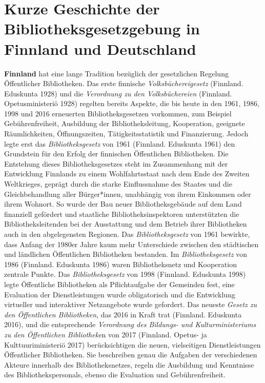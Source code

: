\documentclass[a4paper,
fontsize=11pt,
oneside,
numbers=noperiodatend,
parskip=half-,
bibliography=totoc,
final
]{scrartcl}
\begin{document}
\hypertarget{kurze-geschichte-der-bibliotheksgesetzgebung-in-finnland-und-deutschland}{%
\section{Kurze Geschichte der Bibliotheksgesetzgebung in Finnland
und
Deutschland}\label{kurze-geschichte-der-bibliotheksgesetzgebung-in-finnland-und-deutschland}}

\textbf{Finnland} hat eine lange Tradition bezüglich der gesetzlichen
Regelung Öffentlicher Bibliotheken. Das erste finnische
\emph{Volksbüchereigesetz} (Finnland. Eduskunta 1928) und die
\emph{Verordnung zu den Volksbüchereien} (Finnland. Opetusministeriö
1928) regelten bereits Aspekte, die bis heute in den 1961, 1986, 1998
und 2016 erneuerten Bibliotheksgesetzen vorkommen, zum Beispiel
Gebührenfreiheit, Ausbildung der Bibliotheksleitung, Kooperation,
geeignete Räumlichkeiten, Öffnungszeiten, Tätigkeitsstatistik und
Finanzierung. Jedoch legte erst das \emph{Bibliotheksgesetz} von 1961
(Finnland. Eduskunta 1961) den Grundstein für den Erfolg der finnischen
Öffentlichen Bibliotheken. Die Entstehung dieses Bibliotheksgesetzes
steht im Zusammenhang mit der Entwicklung Finnlands zu einem
Wohlfahrtsstaat nach dem Ende des Zweiten Weltkrieges, geprägt durch die
starke Einflussnahme des Staates und die Gleichbehandlung aller
Bürger*innen, unabhängig von ihrem Einkommen oder ihrem Wohnort. So
wurde der Bau neuer Bibliotheksgebäude auf dem Land finanziell gefördert
und staatliche Bibliotheksinspektoren unterstützten die
Bibliotheksleitenden bei der Ausstattung und dem Betrieb ihrer
Bibliotheken auch in den abgelegensten Regionen. Das
\emph{Bibliotheksgesetz} von 1961 bewirkte, dass Anfang der 1980er Jahre
kaum mehr Unterschiede zwischen den städtischen und ländlichen
Öffentlichen Bibliotheken bestanden. Im \emph{Bibliotheksgesetz} von
1986 (Finnland. Eduskunta 1986) waren Bibliotheksnetz und Kooperation
zentrale Punkte. Das \emph{Bibliotheksgesetz} von 1998 (Finnland.
Eduskunta 1998) legte Öffentliche Bibliotheken als Pflichtaufgabe der
Gemeinden fest, eine Evaluation der Dienstleistungen wurde obligatorisch
und die Entwicklung virtueller und interaktiver Netzangebote wurde
gefordert. Das neueste \emph{Gesetz zu den Öffentlichen Bibliotheken},
das 2016 in Kraft trat (Finnland. Eduskunta 2016), und die entsprechende
\emph{Verordnung des Bildungs- und Kulturministeriums zu den
Öffentlichen Bibliotheke}n von 2017 (Finnland. Opetus- ja
Kulttuuriministeriö 2017) berücksichtigen die neuen, vielseitigen
Dienstleistungen Öffentlicher Bibliotheken. Sie beschreiben genau die
Aufgaben der verschiedenen Akteure innerhalb des Bibliotheksnetzes,
regeln die Ausbildung und Kenntnisse des Bibliothekspersonals, ebenso
die Evaluation und Gebührenfreiheit.
\end{document}
